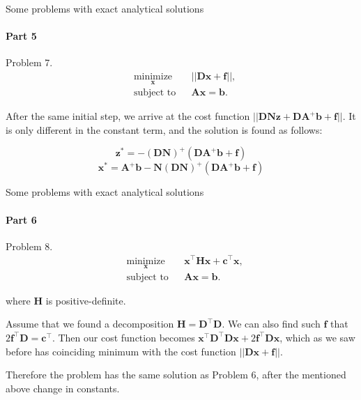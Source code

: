 \documentclass{beamer}
\begin{document}
\begin{frame}{Some problems with exact analytical solutions}
\framesubtitle{Part 5}
\begin{flushleft}

Problem 7. 
%
\begin{equation}
\begin{aligned}
& \underset{\mathbf{x}}{\text{minimize}}
& & || \mathbf{D}\mathbf{x} + \mathbf{f} ||, \\
& \text{subject to}
& & \mathbf{A} \mathbf{x} = \mathbf{b}.
\end{aligned}
\end{equation}

After the same initial step, we arrive at the cost function $|| \mathbf{D}\mathbf{N}\mathbf{z} + \mathbf{D}\mathbf{A}^+\mathbf{b} + \mathbf{f}||$. It is only different in the constant term, and the solution is found as follows:


\begin{equation}
    \mathbf{z}^* = -(\mathbf{D}\mathbf{N})^+ (\mathbf{D}\mathbf{A}^+\mathbf{b} + \mathbf{f})
\end{equation}
\begin{equation}
    \mathbf{x}^* = \mathbf{A}^+\mathbf{b}-\mathbf{N}(\mathbf{D}\mathbf{N})^+ (\mathbf{D}\mathbf{A}^+\mathbf{b} + \mathbf{f})
\end{equation}


\end{flushleft}
\end{frame}



\begin{frame}{Some problems with exact analytical solutions}
\framesubtitle{Part 6}
\begin{flushleft}

Problem 8. 
%
\begin{equation}
\begin{aligned}
& \underset{\mathbf{x}}{\text{minimize}}
& & \mathbf{x}^\top \mathbf{H} \mathbf{x} + \mathbf{c}^\top\mathbf{x}, \\
& \text{subject to}
& & \mathbf{A} \mathbf{x} = \mathbf{b}.
\end{aligned}
\end{equation}

where $\mathbf{H}$ is positive-definite.

\bigskip

Assume that we found a decomposition $\mathbf{H} = \mathbf{D}^\top\mathbf{D}$. We can also find such $\mathbf{f}$ that $2\mathbf{f}^\top\mathbf{D} = \mathbf{c}^\top$. Then our cost function becomes $\mathbf{x}^\top \mathbf{D}^\top\mathbf{D} \mathbf{x} + 2\mathbf{f}^\top\mathbf{D}\mathbf{x}$, which as we saw before has coinciding minimum with the cost function $||\mathbf{D}\mathbf{x} + \mathbf{f}||$.

\bigskip

Therefore the problem has the same solution as Problem 6, after the mentioned above change in constants.

\end{flushleft}
\end{frame}
\end{document}
